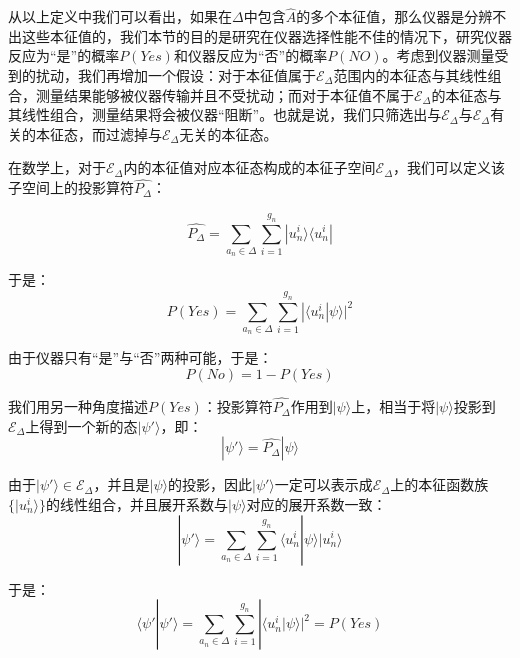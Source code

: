     从以上定义中我们可以看出，如果在$\Delta$中包含$\hat{A}$的多个本征值，那么仪器是分辨不出这些本征值的，我们本节的目的是研究在仪器选择性能不佳的情况下，研究仪器反应为“是”的概率$P(Yes)$和仪器反应为“否”的概率$P(NO)$。考虑到仪器测量受到的扰动，我们再增加一个假设：对于本征值属于$\mathscr{E}_\Delta$范围内的本征态与其线性组合，测量结果能够被仪器传输并且不受扰动；而对于本征值不属于$\mathscr{E}_\Delta$的本征态与其线性组合，测量结果将会被仪器“阻断”。也就是说，我们只筛选出与$\mathscr{E}_\Delta$与$\mathscr{E}_\Delta$有关的本征态，而过滤掉与$\mathscr{E}_\Delta$无关的本征态。
    
    在数学上，对于$\mathscr{E}_\Delta$内的本征值对应本征态构成的本征子空间$\mathscr{E}_\Delta$，我们可以定义该子空间上的投影算符$\hat{P_\Delta}$：
    
    \begin{equation}
        \hat{P_\Delta}=\sum_{a_n\in \Delta}\sum_{i=1}^{g_n}|u_n^i\rangle\langle u_n^i|
    \end{equation}
    
    于是：
    \begin{equation}\label{equ2:F}
       P(Yes)=\sum_{a_n\in \Delta}\sum_{i=1}^{g_n}|\langle u_n^i|\psi\rangle|^2
    \end{equation}
    
    由于仪器只有“是”与“否”两种可能，于是：
    \begin{equation}
        P(No)=1-P(Yes)
    \end{equation}

    我们用另一种角度描述$P(Yes)$：投影算符$\hat{P_\Delta}$作用到$|\psi\rangle$上，相当于将$|\psi\rangle$投影到$\mathscr{E}_\Delta$上得到一个新的态$|\psi'\rangle$，即：
    \begin{equation}
        |\psi'\rangle=\hat{P_\Delta}|\psi\rangle
    \end{equation}
    
    由于$|\psi'\rangle\in\mathscr{E}_\Delta$，并且是$|\psi\rangle$的投影，因此$|\psi'\rangle$一定可以表示成$\mathscr{E}_\Delta$上的本征函数族$\{|u_n^i\rangle\}$的线性组合，并且展开系数与$|\psi\rangle$对应的展开系数一致：
    \begin{equation}
        |\psi'\rangle=\sum_{a_n\in\Delta}\sum_{i=1}^{g_n}\langle u_n^i|\psi\rangle|u_n^i\rangle
    \end{equation}
    
    于是：
    \begin{equation}
        \langle \psi'|\psi'\rangle=\sum_{a_n\in \Delta}\sum_{i=1}^{g_n}|\langle u_n^i|\psi\rangle|^2=P(Yes)
    \end{equation}
    
